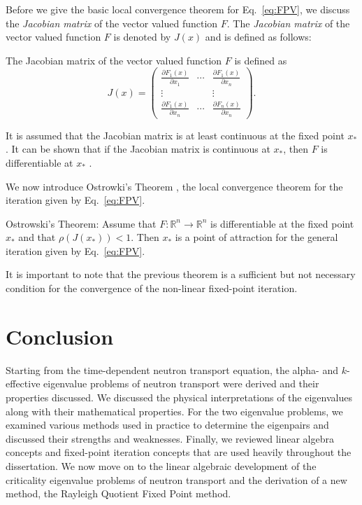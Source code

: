 Before we give the basic local convergence theorem for Eq.~\ref{eq:FPV}, we discuss the \textit{Jacobian matrix} of the vector valued function $F$. The \textit{Jacobian matrix} of the vector valued function $F$ is denoted by $J(x)$ and is defined as follows:

\begin{definition}
	The Jacobian matrix of the vector valued function $F$ is defined as
	\begin{equation}
		J(x) = \begin{pmatrix}
					\frac{\partial F_{1}(x)}{\partial x_{1}} & \cdots & 	\frac{\partial F_{1}(x)}{\partial x_{n}} \\
					\vdots & & \vdots \\
					\frac{\partial F_{1}(x)}{\partial x_{n}} & \cdots & 	\frac{\partial F_{n}(x)}{\partial x_{n}}
			      \end{pmatrix}.
	\end{equation}
\end{definition}
It is assumed that the Jacobian matrix is at least continuous at the fixed point $x_{*}$. It can be shown that if the Jacobian matrix is continuous at $x_{*}$, then $F$ is differentiable at $x_{*}$ \cite{ortega_numerical_1990}.

We now introduce Ostrowki's Theorem \cite{ostrowski_solution_2016}, the local convergence theorem for the iteration given by Eq.~\ref{eq:FPV}.

\begin{theorem}{Ostrowski's Theorem:}
	Assume that $F: \mathbb{R}^{n} \rightarrow \mathbb{R}^{n}$ is differentiable at the fixed point $x_{*}$ and that $\rho(J(x_{*})) < 1$. Then $x_{*}$ is a point of attraction for the general iteration given by Eq.~\ref{eq:FPV}.
\end{theorem}

It is important to note that the previous theorem is a sufficient but not necessary condition for the convergence of the non-linear fixed-point iteration.

\section{Conclusion} 

Starting from the time-dependent neutron transport equation, the alpha- and $k$-effective eigenvalue problems of neutron transport were derived and their properties discussed. We discussed the physical interpretations of the eigenvalues along with their mathematical properties. For the two eigenvalue problems, we examined various methods used in practice to determine the eigenpairs and discussed their strengths and weaknesses. Finally, we reviewed linear algebra concepts and fixed-point iteration concepts that are used heavily throughout the dissertation. We now move on to the linear algebraic development of the criticality eigenvalue problems of neutron transport and the derivation of a new method, the Rayleigh Quotient Fixed Point method.

